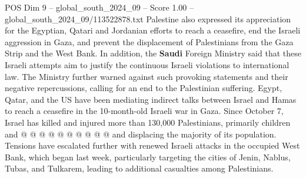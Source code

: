 \begin{textsample}{POS Dim 9 – global\_south\_2024\_09 – Score 1.00 – global\_south\_2024\_09/113522878.txt}
Palestine also expressed its appreciation for the Egyptian, Qatari and Jordanian efforts to reach a ceasefire, end the Israeli aggression in Gaza, and prevent the displacement of Palestinians from the Gaza Strip and the West Bank.
In addition, the \textbf{Saudi} Foreign Ministry said that these Israeli attempts aim to justify the continuous Israeli violations to international law.
The Ministry further warned against such provoking statements and their negative repercussions, calling for an end to the Palestinian suffering.
Egypt, Qatar, and the US have been mediating indirect talks between Israel and Hamas to reach a ceasefire in the 10-month-old Israeli war in Gaza.
Since October 7, Israel has killed and injured more than 130,000 Palestinians, primarily children and @ @ @ @ @ @ @ @ @ @ and displacing the majority of its population.
Tensions have escalated further with renewed Israeli attacks in the occupied West Bank, which began last week, particularly targeting the cities of Jenin, Nablus, Tubas, and Tulkarem, leading to additional casualties among Palestinians.

\end{textsample}
